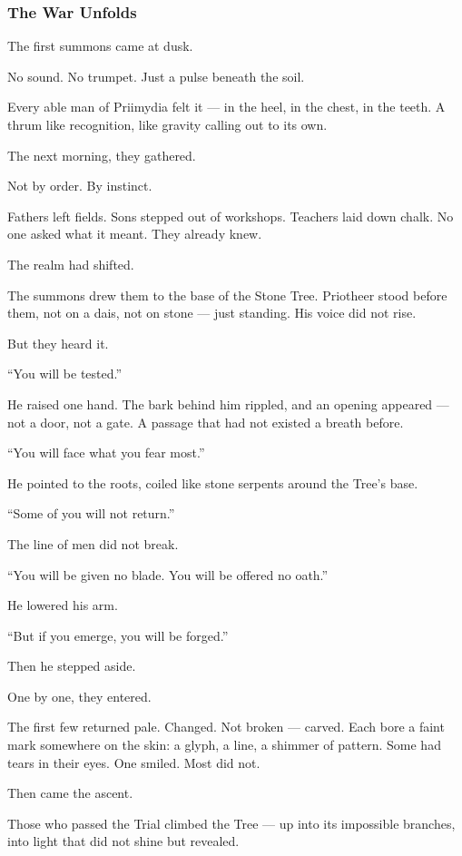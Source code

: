 \documentclass[12pt]{article}
\begin{document}
\subsubsection*{The War Unfolds}

The first summons came at dusk.

No sound. No trumpet. Just a pulse beneath the soil.

Every able man of Priimydia felt it — in the heel, in the chest, in the teeth. A thrum like recognition, like gravity calling out to its own.

The next morning, they gathered.

Not by order. By instinct.

Fathers left fields. Sons stepped out of workshops. Teachers laid down chalk. No one asked what it meant. They already knew.

The realm had shifted.

The summons drew them to the base of the Stone Tree. Priotheer stood before them, not on a dais, not on stone — just standing. His voice did not rise.

But they heard it.

``You will be tested.''

He raised one hand. The bark behind him rippled, and an opening appeared — not a door, not a gate. A passage that had not existed a breath before.

``You will face what you fear most.''

He pointed to the roots, coiled like stone serpents around the Tree’s base.

``Some of you will not return.''

The line of men did not break.

``You will be given no blade. You will be offered no oath.''

He lowered his arm.

``But if you emerge, you will be forged.''

Then he stepped aside.

One by one, they entered.

The first few returned pale. Changed. Not broken — carved. Each bore a faint mark somewhere on the skin: a glyph, a line, a shimmer of pattern. Some had tears in their eyes. One smiled. Most did not.

Then came the ascent.

Those who passed the Trial climbed the Tree — up into its impossible branches, into light that did not shine but revealed.
\end{document}
